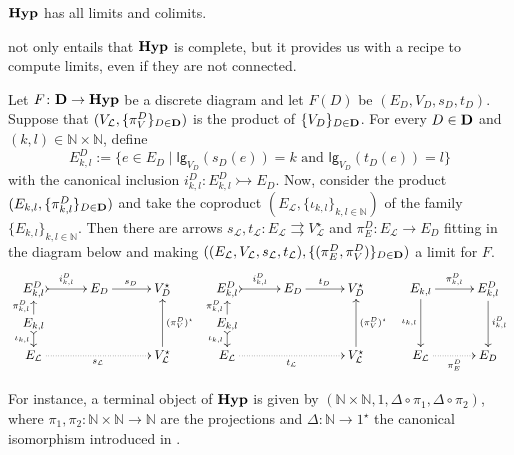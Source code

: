 \documentclass[3p]{elsarticle}
\newcommand{\lgh}{\mathsf{lg}}
\def\D{\textbf {\textup{D}}}
\newcommand{\catname}[1]{\textbf{\textup{#1}}}
\newcommand{\hyp}{\catname{Hyp}}
\newcommand{\mto}{\rightarrowtail}
\theoremstyle{remark}
\theoremstyle{definition}
\begin{document}
\begin{cor}\label{prop:cocomp}
	$\hyp$ has all limits and colimits.
\end{cor}


 not only entails that $\hyp$ is complete, but it provides us with a recipe to compute limits, even if they are not connected.
	\begin{cor}\label{lem:prod}
		Let $F\colon \D\to \hyp $ be a  discrete diagram and let $F(D)$ be $(E_D, V_D, s_D,  t_D)$. Suppose that $(V_{\mathcal{L}}, \{\pi^D_V\}_{D\in \D})$ is the product of $\{V_D\}_{D\in \D}$. For every $D\in \D$ and $(k,l)\in \mathbb{N}\times \mathbb{N}$, define
		\[E^D_{k,l}:=\{e\in E_D \mid \lgh_{V_D}(s_{D}(e)) = k \text{ and } \lgh_{V_D}(t_{D}(e)) = l \}\]
		with the canonical inclusion $i^D_{k,l}\colon E^D_{k,l}\mto E_D$.	Now, consider the product $(E_{k,l}, \{\pi^D_{k,l}\}_{D\in \D})$ and take the coproduct $(E_{\mathcal{L}}, \{\iota_{k,l}\}_{k,l \in \mathbb{N}})$ of the family $\{E_{k,l}\}_{k,l \in \mathbb{N}}$. Then there are arrows $s_{\mathcal{L}}, t_{\mathcal{L}}\colon E_{\mathcal{L}}\rightrightarrows V_{\mathcal{L}}^\star$ and $\pi^D_E\colon E_{\mathcal{L}}\to E_D$ fitting in the diagram below and making $((E_{\mathcal{L}}, V_{\mathcal{L}}, s_{\mathcal{L}}, t_{\mathcal{L}}), \{(\pi^D_E, \pi^D_V)\}_{D\in \D})$ a limit for $F$.
		\[\xymatrix@R=10pt@C=30pt{E^D_{k,l} \ar@{>->}[r]^{i^D_{k,l}} & E_D \ar[r]^{s_D} & V^\star_D  &E^D_{k,l} \ar@{>->}[r]^{i^D_{k,l}} & E_D \ar[r]^{t_D} & V^\star_D & E_{k,l} \ar[r]^{\pi^D_{k,l}} \ar[dd]_{\iota_{k,l}} & E^{D}_{k,l} \ar[dd]^{i^D_{k,l}}\\  E_{k,l} \ar@{>->}[d]_{\iota_{k,l}} \ar[u]^{\pi^D_{k,l}}  & & &E_{k,l} \ar@{>->}[d]_{\iota_{k,l}} \ar[u]^{\pi^D_{k,l}}  & & \\  E_{\mathcal{L}}   \ar@{.>}[rr]_{s_\mathcal{L}}& &V_{\mathcal{L}}^\star \ar[uu]_{(\pi^D_V)^\star} &  E_{\mathcal{L}}   \ar@{.>}[rr]_{t_\mathcal{L}}& &V_{\mathcal{L}}^\star \ar[uu]_{(\pi^D_V)^\star} & E_{\mathcal{L}} \ar@{.>}[r]_{\pi^D_E} & E_D}
		\]
	\end{cor}

\begin{exa}\label{ex:term} For instance, a terminal object of $\hyp$ is given by $(\mathbb{N}\times \mathbb{N}, 1, \Delta\circ \pi_1, \Delta\circ \pi_2)$, where $\pi_1, \pi_2\colon \mathbb{N}\times \mathbb{N}\to \mathbb{N}$ are the projections and $\Delta\colon \mathbb{N}\to 1^\star$ the canonical isomorphism introduced in . 
\end{exa}
\end{document}
